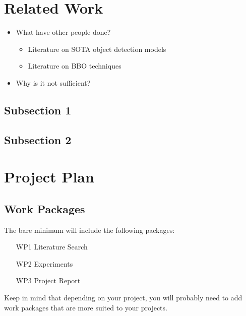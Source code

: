 \documentclass[thesis]{mas_proposal}
\begin{document}


\section{Related Work}
\begin{itemize}
    \item What have other people done?
    \begin{itemize}
        \item Literature on SOTA object detection models
        
        \item Literature on BBO techniques
    \end{itemize}
    \item Why is it not sufficient?
\end{itemize}

\subsection{Subsection 1}
\subsection{Subsection 2}



\section{Project Plan}

\subsection{Work Packages}
The bare minimum will include the following packages:
\begin{enumerate}
    \item[WP1] Literature Search
    \item[WP2] Experiments
    \item[WP3] Project Report
\end{enumerate}
Keep in mind that depending on your project, you will probably need to add work packages that are more suited to your projects.
\end{document}
